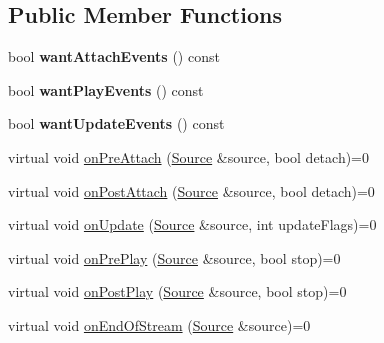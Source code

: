 \subsection*{Public Member Functions}
\begin{DoxyCompactItemize}
\item 
bool {\bfseries want\+Attach\+Events} () const \hypertarget{classAudio_1_1SourceListener_a8e3e52b9dd63cf5762fe65345c513fab}{}\label{classAudio_1_1SourceListener_a8e3e52b9dd63cf5762fe65345c513fab}

\item 
bool {\bfseries want\+Play\+Events} () const \hypertarget{classAudio_1_1SourceListener_a5369597901404cf9c0be71e3fffc6c4d}{}\label{classAudio_1_1SourceListener_a5369597901404cf9c0be71e3fffc6c4d}

\item 
bool {\bfseries want\+Update\+Events} () const \hypertarget{classAudio_1_1SourceListener_a8e175ff5e871094fa5b9bdbb89c054e2}{}\label{classAudio_1_1SourceListener_a8e175ff5e871094fa5b9bdbb89c054e2}

\item 
virtual void \hyperlink{classAudio_1_1SourceListener_a94d0898f9f31e755696e14c9ffdcf408}{on\+Pre\+Attach} (\hyperlink{classAudio_1_1Source}{Source} \&source, bool detach)=0
\item 
virtual void \hyperlink{classAudio_1_1SourceListener_abb3c327881e989b24ca87c36b2a769b6}{on\+Post\+Attach} (\hyperlink{classAudio_1_1Source}{Source} \&source, bool detach)=0
\item 
virtual void \hyperlink{classAudio_1_1SourceListener_a63e8ecc4c172b1d1f116e8115e708b41}{on\+Update} (\hyperlink{classAudio_1_1Source}{Source} \&source, int update\+Flags)=0
\item 
virtual void \hyperlink{classAudio_1_1SourceListener_a926f5330f826c550a22cb9ef1abb0264}{on\+Pre\+Play} (\hyperlink{classAudio_1_1Source}{Source} \&source, bool stop)=0
\item 
virtual void \hyperlink{classAudio_1_1SourceListener_a3ec4cc743ec0a92a8448b12e562a6529}{on\+Post\+Play} (\hyperlink{classAudio_1_1Source}{Source} \&source, bool stop)=0
\item 
virtual void \hyperlink{classAudio_1_1SourceListener_a539fe71a1a4fa846801ce3a1821524ba}{on\+End\+Of\+Stream} (\hyperlink{classAudio_1_1Source}{Source} \&source)=0
\end{DoxyCompactItemize}
